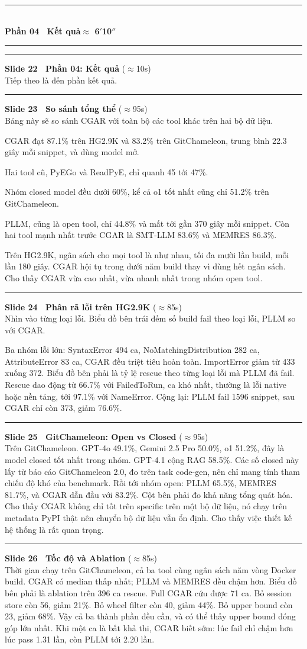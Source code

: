 \documentclass[11pt]{article}
\newcommand{\parthead}[2]{%
  \vspace{1.4em}\par
  {\noindent\color{navydeep}\rule{\linewidth}{1.4pt}}\\[0.35em]
  {\bfseries\Large\color{navydeep}#1}\hfill{\normalsize\color{accent}\bfseries #2}\\[-0.35em]
  {\noindent\color{navydeep}\rule{\linewidth}{1.4pt}}
  \par\vspace{0.6em}%
}
\newcommand{\slidehead}[3]{%
  \vspace{1.05em}\par\noindent
  {\color{accent}\rule[-0.18em]{3pt}{1.05em}}\hspace{0.5em}%
  {\bfseries\large\color{navydeep}Slide #1 \textperiodcentered\ #2}%
  \hfill{\small\color{gray}(#3)}\\[0.25em]%
}
\begin{document}
\parthead{Phần 04 \textperiodcentered\ Kết quả}{$\approx$ 6$'$10$''$}

\slidehead{22}{Phần 04: Kết quả}{$\approx$10s}
Tiếp theo là đến phần kết quả.

\slidehead{23}{So sánh tổng thể}{$\approx$95s}
Bảng này sẽ so sánh CGAR với toàn bộ các tool khác trên hai bộ dữ liệu.

CGAR đạt 87.1\% trên HG2.9K và 83.2\% trên GitChameleon, trung bình 22.3 giây mỗi snippet, và dùng model mở.

Hai tool cũ, PyEGo và ReadPyE, chỉ quanh 45 tới 47\%.

Nhóm closed model đều dưới 60\%, kể cả o1 tốt nhất cũng chỉ 51.2\% trên GitChameleon.

PLLM, cũng là open tool, chỉ 44.8\% và mất tới gần 370 giây mỗi snippet. Còn hai tool mạnh nhất trước CGAR là SMT-LLM 83.6\% và MEMRES 86.3\%.

Trên HG2.9K, ngân sách cho mọi tool là như nhau, tối đa mười lần build, mỗi lần 180 giây. CGAR hội tụ trong dưới năm build thay vì dùng hết ngân sách. Cho thấy CGAR vừa cao nhất, vừa nhanh nhất trong nhóm open tool.

\slidehead{24}{Phân rã lỗi trên HG2.9K}{$\approx$85s}
Nhìn vào từng loại lỗi. Biểu đồ bên trái đếm số build fail theo loại lỗi, PLLM so với CGAR.

Ba nhóm lỗi lớn: SyntaxError 494 ca, NoMatchingDistribution 282 ca, AttributeError 83 ca, CGAR đều triệt tiêu hoàn toàn. ImportError giảm từ 433 xuống 372. Biểu đồ bên phải là tỷ lệ rescue theo từng loại lỗi mà PLLM đã fail. Rescue dao động từ 66.7\% với FailedToRun, ca khó nhất, thường là lỗi native hoặc nền tảng, tới 97.1\% với NameError. Cộng lại: PLLM fail 1596 snippet, sau CGAR chỉ còn 373, giảm 76.6\%.

\slidehead{25}{GitChameleon: Open vs Closed}{$\approx$95s}
Trên GitChameleon. GPT-4o 49.1\%, Gemini 2.5 Pro 50.0\%, o1 51.2\%, đây là model closed tốt nhất trong nhóm. GPT-4.1 cộng RAG 58.5\%. Các số closed này lấy từ báo cáo GitChameleon 2.0, đo trên task code-gen, nên chỉ mang tính tham chiếu độ khó của benchmark. Rồi tới nhóm open: PLLM 65.5\%, MEMRES 81.7\%, và CGAR dẫn đầu với 83.2\%. Cột bên phải đo khả năng tổng quát hóa. Cho thấy CGAR không chỉ tốt trên specific trên một bộ dữ liệu, nó chạy trên metadata PyPI thật nên chuyển bộ dữ liệu vẫn ổn định. Cho thấy việc thiết kế hệ thống là rất quan trọng.

\slidehead{26}{Tốc độ và Ablation}{$\approx$85s}
Thời gian chạy trên GitChameleon, cả ba tool cùng ngân sách năm vòng Docker build. CGAR có median thấp nhất; PLLM và MEMRES đều chậm hơn. Biểu đồ bên phải là ablation trên 396 ca rescue. Full CGAR cứu được 71 ca. Bỏ session store còn 56, giảm 21\%. Bỏ wheel filter còn 40, giảm 44\%. Bỏ upper bound còn 23, giảm 68\%. Vậy cả ba thành phần đều cần, và có thể thấy upper bound đóng góp lớn nhất. Khi một ca là bất khả thi, CGAR biết sớm: lúc fail chỉ chậm hơn lúc pass 1.31 lần, còn PLLM tới 2.20 lần.
\end{document}
